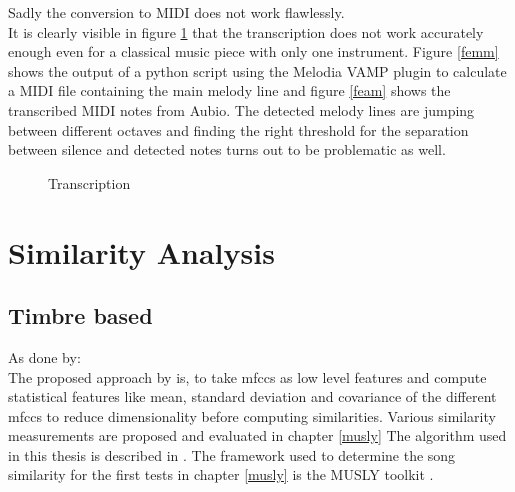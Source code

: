 Sadly the conversion to MIDI does not work flawlessly.\\
It is clearly visible in figure \ref{fig:transc} that the transcription does not work accurately enough even for a classical music piece with only one instrument. Figure \ref{femm} shows the output of a python script using the Melodia VAMP plugin to calculate a MIDI file containing the main melody line and figure \ref{feam} shows the transcribed MIDI notes from Aubio. The detected melody lines are jumping between different octaves and finding the right threshold for the separation between silence and detected notes turns out to be problematic as well.

\begin{figure}[htbp]
	\centering
	\caption{Transcription}
	\label{fig:transc}
\end{figure}
\FloatBarrier 

\section{Similarity Analysis}

\subsection{Timbre based}

As done by: \cite{schnitzer1}\\
The proposed approach by \cite{schnitzer1} is, to take mfccs as low level features and compute statistical features like mean, standard deviation and covariance of the different mfccs to reduce dimensionality before computing similarities.
Various similarity measurements are proposed and evaluated in chapter \ref{musly}
The algorithm used in this thesis is described in \cite[pp. 17ff]{schnitzer1}. The framework used to determine the song similarity for the first tests in chapter \ref{musly} is the MUSLY toolkit \cite{musly1}. 

